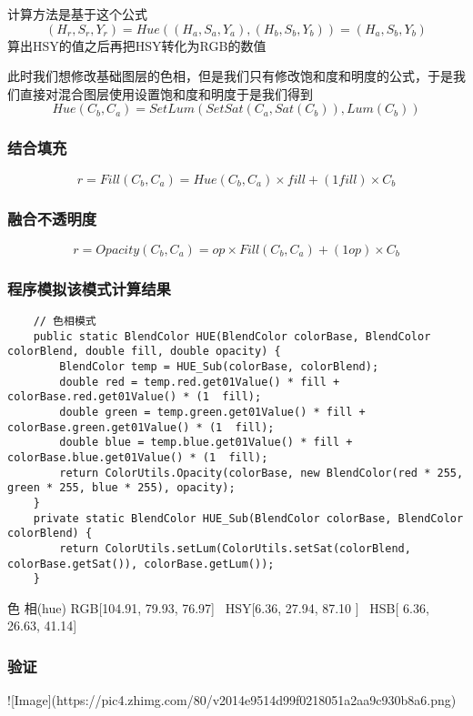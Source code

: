 计算方法是基于这个公式
$$(H_r,S_r,Y_r)=Hue((H_a,S_a,Y_a),(H_b,S_b,Y_b))=(H_a,S_b,Y_b)$$
算出HSY的值之后再把HSY转化为RGB的数值

此时我们想修改基础图层的色相，但是我们只有修改饱和度和明度的公式，于是我们直接对混合图层使用设置饱和度和明度于是我们得到
$$Hue(C_b,C_a)=SetLum(SetSat(C_a,Sat(C_b)),Lum(C_b))$$

\subsubsection{ 结合填充}

$$r=Fill(C_b,C_a)= Hue(C_b,C_a) \times fill + (1fill)\times C_b$$

\subsubsection{ 融合不透明度}

$$r=Opacity(C_b,C_a)=op\times Fill(C_b,C_a)+(1op)\times C_b$$

\subsubsection{ 程序模拟该模式计算结果}

\begin{lstlisting}
	// 色相模式
	public static BlendColor HUE(BlendColor colorBase, BlendColor colorBlend, double fill, double opacity) {
		BlendColor temp = HUE_Sub(colorBase, colorBlend);
		double red = temp.red.get01Value() * fill + colorBase.red.get01Value() * (1  fill);
		double green = temp.green.get01Value() * fill + colorBase.green.get01Value() * (1  fill);
		double blue = temp.blue.get01Value() * fill + colorBase.blue.get01Value() * (1  fill);
		return ColorUtils.Opacity(colorBase, new BlendColor(red * 255, green * 255, blue * 255), opacity);
	}
	private static BlendColor HUE_Sub(BlendColor colorBase, BlendColor colorBlend) {
		return ColorUtils.setLum(ColorUtils.setSat(colorBlend, colorBase.getSat()), colorBase.getLum());
	}
\end{lstlisting}



色    相(hue)           RGB[104.91,  79.93,  76.97]~ HSY[6.36,  27.94,  87.10  ]~ HSB[  6.36,  26.63,  41.14]


\subsubsection{ 验证}

![Image](https://pic4.zhimg.com/80/v2014e9514d99f0218051a2aa9c930b8a6.png)


